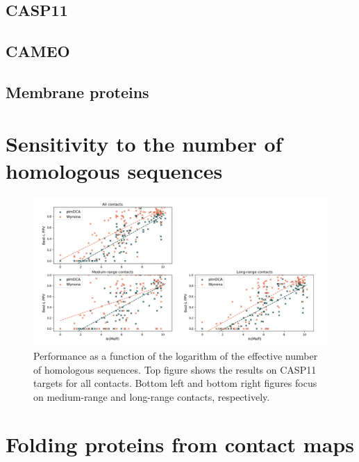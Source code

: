     \subsection{CASP11}

        \todo{}

    \subsection{CAMEO}

        \todo{}

    \subsection{Membrane proteins}

        \todo{}

\section{Sensitivity to the number of homologous sequences}

    \begin{figure}[H]
        \begin{center}
            \includegraphics[width=\textwidth, keepaspectratio]{imgs/Meff.png}
            \caption{Performance as a function of the logarithm of the effective
            number of homologous sequences. Top figure shows the results on
            CASP11 targets for all contacts. Bottom left and bottom right figures
            focus on medium-range and long-range contacts, respectively.}
            \label{sensitivity}
        \end{center}
    \end{figure}

\section{Folding proteins from contact maps}

